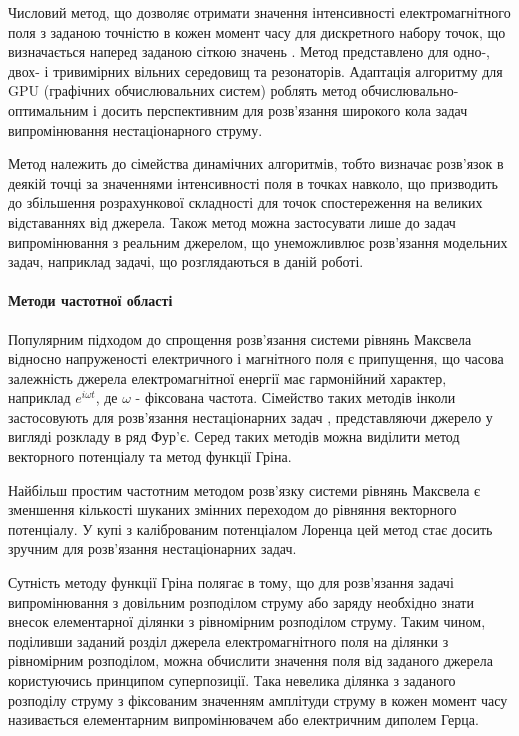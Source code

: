 Числовий метод, що дозволяє отримати значення інтенсивності електромагнітного 
поля з заданою точністю в кожен момент часу для дискретного набору точок, що
визначається наперед заданою сіткою значень \cite{imp:FDTD1966}. Метод 
представлено для одно-, двох- і тривимірних \cite{imp:FDTD1975} вільних 
середовищ та резонаторів. Адаптація алгоритму для GPU (графічних 
обчислювальних систем) \cite{imp:FDTD2011} роблять метод 
обчислювально-оптимальним і досить перспективним для розв'язання 
широкого кола задач випромінювання нестаціонарного струму.

Метод належить до сімейства динамічних алгоритмів, тобто визначає розв'язок 
в деякій точці за значеннями інтенсивності поля в точках навколо, що 
призводить до збільшення розрахункової складності для точок спостереження на 
великих відставаннях від джерела. Також метод можна застосувати лише до 
задач випромінювання з реальним джерелом, що унеможливлює розв'язання 
модельних задач, наприклад задачі, що розглядаються в даній роботі.

\paragraph{Методи частотної області}

Популярним підходом до спрощення розв'язання системи рівнянь Максвела відносно
напруженості електричного і магнітного поля є припущення, що часова залежність 
джерела електромагнітної енергії має гармонійний характер, наприклад 
$ e^{i \omega t} $, де $ \omega $ - фіксована частота. Сімейство таких 
методів \cite{imp:Shubarin1960} інколи застосовують для розв'язання 
нестаціонарних задач \cite{imp:Harmuth1981}, представляючи джерело у вигляді 
розкладу в ряд Фур'є. Серед таких методів можна виділити метод векторного 
потенціалу та метод функції Гріна.

Найбільш простим частотним методом розв'язку системи рівнянь Максвела є 
зменшення кількості шуканих змінних переходом до рівняння векторного 
потенціалу. У купі з каліброваним потенціалом Лоренца цей метод стає досить 
зручним для розв'язання нестаціонарних задач.

Сутність методу функції Гріна полягає в тому, що для розв'язання задачі 
випромінювання з довільним розподілом струму або заряду необхідно знати 
внесок елементарної ділянки з рівномірним розподілом струму. Таким чином, 
поділивши заданий розділ джерела електромагнітного поля на ділянки з 
рівномірним розподілом, можна обчислити значення поля від заданого джерела 
користуючись принципом суперпозиції. Така невелика ділянка з заданого розподілу 
струму з фіксованим значенням амплітуди струму в кожен момент часу називається
елементарним випромінювачем або електричним диполем Герца.

